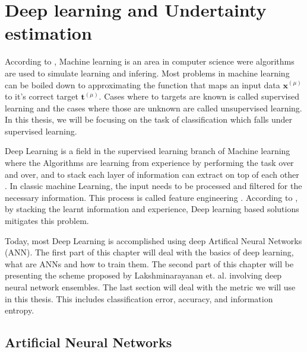 \chapter{Deep learning and Undertainty estimation}

According to \cite{rogers2016first}, Machine learning is an area in computer science were algorithms are used to simulate learning and infering. Most problems in machine learning can be boiled down to approximating the function that maps an input data $\bm{x}^{(\mu)}$ to it's correct target $\bm{t}^{(\mu)}$. Cases where to targets are known is called supervised learning and the cases where those are unknown are called unsupervised learning. In this thesis, we will be focusing on the task of classification which falls under supervised learning\cite{mehligcourseslides}.

Deep Learning is a field in the supervised learning branch of Machine learning where the Algorithms are learning from experience by performing the task over and over, and to stack each layer of information can extract on top of each other \cite{Goodfellow-et-al-2016}. In classic machine Learning, the input needs to be processed and filtered for the necessary information. This process is called feature engineering \cite{rogers2016first}. According to \cite{Goodfellow-et-al-2016}, by stacking the learnt information and experience, Deep learning based solutions mitigates this problem.

Today, most Deep Learning is accomplished using deep Artifical Neural Networks (ANN). The first part of this chapter will deal with the basics of deep learning, what are ANNs and how to train them. The second part of this chapter will be presenting the scheme proposed by Lakshminarayanan et. al. \cite{lakshminarayanan2017simple} involving deep neural network ensembles. The last section will deal with the metric we will use in this thesis. This includes classification error, accuracy, and information entropy. 

\section{Artificial Neural Networks}

